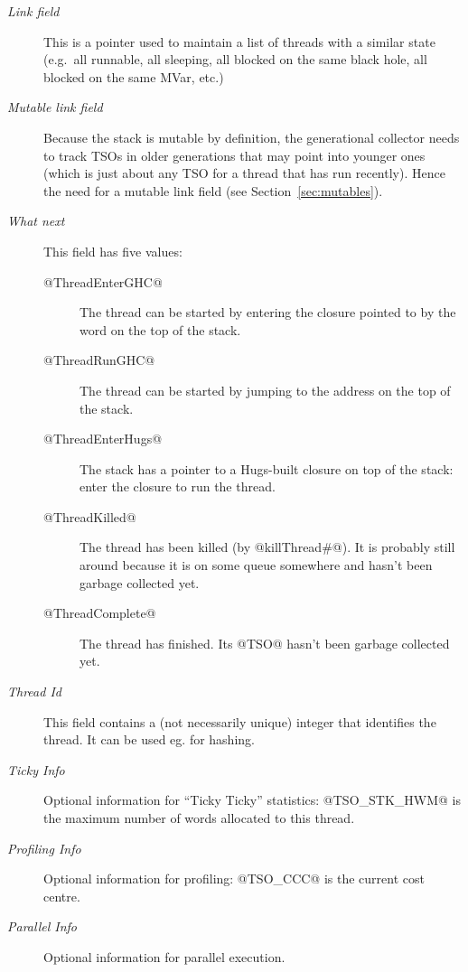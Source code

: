 \documentclass[11pt]{article}
\newcommand{\secref}[1]{Section~\ref{sec:#1}}
\begin{document}
\begin{description}

\item[\emph{Link field}] This is a pointer used to maintain a list of
threads with a similar state (e.g.~all runnable, all sleeping, all
blocked on the same black hole, all blocked on the same MVar,
etc.)

\item[\emph{Mutable link field}] Because the stack is mutable by
definition, the generational collector needs to track TSOs in older
generations that may point into younger ones (which is just about any
TSO for a thread that has run recently).  Hence the need for a mutable
link field (see \secref{mutables}).

\item[\emph{What next}]
This field has five values:  
\begin{description}
\item[@ThreadEnterGHC@]  The thread can be started by entering the
closure pointed to by the word on the top of the stack.
\item[@ThreadRunGHC@]  The thread can be started by jumping to the
address on the top of the stack.
\item[@ThreadEnterHugs@]  The stack has a pointer to a Hugs-built
closure on top of the stack: enter the closure to run the thread.
\item[@ThreadKilled@] The thread has been killed (by @killThread#@).
It is probably still around because it is on some queue somewhere and
hasn't been garbage collected yet.
\item[@ThreadComplete@] The thread has finished.  Its @TSO@ hasn't
been garbage collected yet.
\end{description}

\item[\emph{Thread Id}]
This field contains a (not necessarily unique) integer that identifies
the thread.  It can be used eg. for hashing.

\item[\emph{Ticky Info}] Optional information for ``Ticky Ticky''
statistics: @TSO_STK_HWM@ is the maximum number of words allocated to
this thread.

\item[\emph{Profiling Info}] Optional information for profiling:
@TSO_CCC@ is the current cost centre.

\item[\emph{Parallel Info}]
Optional information for parallel execution.


\end{description}
\end{document}
